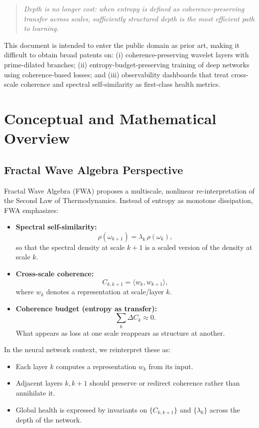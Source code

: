 \documentclass[11pt]{article}
\begin{document}
\begin{quote}
\emph{Depth is no longer cost: when entropy is defined as coherence-preserving transfer across scales, sufficiently structured depth is the most efficient path to learning.}
\end{quote}

This document is intended to enter the public domain as prior art, making it difficult to obtain broad patents on: (i) coherence-preserving wavelet layers with prime-dilated branches; (ii) entropy-budget-preserving training of deep networks using coherence-based losses; and (iii) observability dashboards that treat cross-scale coherence and spectral self-similarity as first-class health metrics.

\section{Conceptual and Mathematical Overview}

\subsection{Fractal Wave Algebra Perspective}

Fractal Wave Algebra (FWA) proposes a multiscale, nonlinear re-interpretation of the Second Law of Thermodynamics. Instead of entropy as monotone dissipation, FWA emphasizes:

\begin{itemize}
  \item \textbf{Spectral self-similarity:}
  \[
    \rho(\omega_{k+1}) = \lambda_k \,\rho(\omega_k),
  \]
  so that the spectral density at scale $k{+}1$ is a scaled version of the density at scale $k$.

  \item \textbf{Cross-scale coherence:}
  \[
    C_{k,k+1} = \langle w_k, w_{k+1}\rangle,
  \]
  where $w_k$ denotes a representation at scale/layer $k$.

  \item \textbf{Coherence budget (entropy as transfer):}
  \[
    \sum_k \Delta C_k \approx 0.
  \]
  What appears as loss at one scale reappears as structure at another.
\end{itemize}

In the neural network context, we reinterpret these as:

\begin{itemize}
  \item Each layer $k$ computes a representation $w_k$ from its input.
  \item Adjacent layers $k,k{+}1$ should preserve or redirect coherence rather than annihilate it.
  \item Global health is expressed by invariants on $\{C_{k,k+1}\}$ and $\{\lambda_k\}$ across the depth of the network.
\end{itemize}
\end{document}
